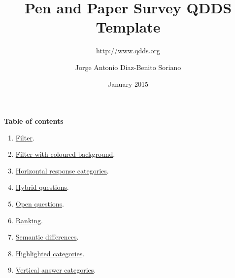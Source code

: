 \documentclass[12pt,fleqn]{scrreprt}
\title{Pen and Paper Survey QDDS Template}
\subtitle{\url{http://www.qdds.org}}
\author{Jorge Antonio Diaz-Benito Soriano}
\date{January 2015}
\begin{document}
\maketitle

\newpage
{}
\setcounter{page}{1}
\textbf{Table of contents}
\begin{enumerate}
\item \hyperref[Filter]{Filter}.
\item \hyperref[Filter with coloured background]{Filter with coloured background}.
\item \hyperref[Horizontal response categories]{Horizontal response categories}.
\item \hyperref[Hybrid questions]{Hybrid questions}.
\item \hyperref[Open questions]{Open questions}.
\item \hyperref[Ranking]{Ranking}.
\item \hyperref[Semantic differences]{Semantic differences}.
\item \hyperref[Highlighted categories]{Highlighted categories}.
\item \hyperref[Vertical answer categories]{Vertical answer categories}.
\end{enumerate}

\newpage
{}	
\setcounter{page}{1}










\end{document}
